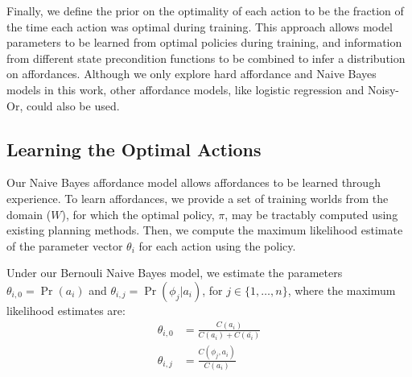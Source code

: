 \documentclass[letterpaper]{article}
\begin{document}
Finally, we define the prior on the optimality of each action to be
the fraction of the time each action was optimal during training.
This approach allows model parameters to be learned from optimal
policies during training, and information from different state
precondition functions to be combined to infer a distribution on
affordances.  Although we only explore hard affordance and Naive Bayes
models in this work, other affordance models, like logistic regression
and Noisy-Or, could also be used.




\subsection{Learning the Optimal Actions}
Our Naive Bayes affordance model allows
affordances to be learned through experience.  To learn affordances,
we provide a set of training worlds from the domain ($W$), for which
the optimal policy, $\pi$, may be tractably computed using existing
planning methods. Then, we compute the maximum likelihood estimate of the
parameter vector $\theta_i$ for each action using the policy.

Under our Bernouli Naive Bayes model, we estimate the parameters
$\theta_{i,0} = \Pr(a_i)$ and $\theta_{i,j} = \Pr(\phi_j | a_i)$, for $j \in \{1, \ldots, n \}$, where the maximum likelihood estimates are:
\begin{align}
\theta_{i,0} &= \frac{C(a_i)}{C(a_i) + C(\bar{a_i})} \\
\theta_{i,j} &= \frac{C(\phi_j, a_i)}{C(a_i)}
\end{align}
\end{document}
